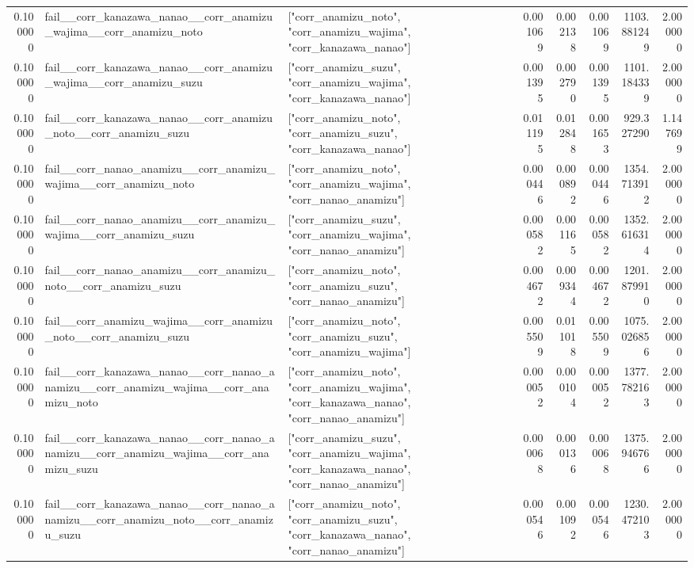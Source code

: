 \begin{tabular}{rllrrrrr}
0.100000 & fail\_\_corr\_kanazawa\_nanao\_\_corr\_anamizu\_wajima\_\_corr\_anamizu\_noto & ["corr\_anamizu\_noto", "corr\_anamizu\_wajima", "corr\_kanazawa\_nanao"] & 0.001069 & 0.002138 & 0.001069 & 1103.881249 & 2.000000 \\
0.100000 & fail\_\_corr\_kanazawa\_nanao\_\_corr\_anamizu\_wajima\_\_corr\_anamizu\_suzu & ["corr\_anamizu\_suzu", "corr\_anamizu\_wajima", "corr\_kanazawa\_nanao"] & 0.001395 & 0.002790 & 0.001395 & 1101.184339 & 2.000000 \\
0.100000 & fail\_\_corr\_kanazawa\_nanao\_\_corr\_anamizu\_noto\_\_corr\_anamizu\_suzu & ["corr\_anamizu\_noto", "corr\_anamizu\_suzu", "corr\_kanazawa\_nanao"] & 0.011195 & 0.012848 & 0.001653 & 929.327290 & 1.147699 \\
0.100000 & fail\_\_corr\_nanao\_anamizu\_\_corr\_anamizu\_wajima\_\_corr\_anamizu\_noto & ["corr\_anamizu\_noto", "corr\_anamizu\_wajima", "corr\_nanao\_anamizu"] & 0.000446 & 0.000892 & 0.000446 & 1354.713912 & 2.000000 \\
0.100000 & fail\_\_corr\_nanao\_anamizu\_\_corr\_anamizu\_wajima\_\_corr\_anamizu\_suzu & ["corr\_anamizu\_suzu", "corr\_anamizu\_wajima", "corr\_nanao\_anamizu"] & 0.000582 & 0.001165 & 0.000582 & 1352.616314 & 2.000000 \\
0.100000 & fail\_\_corr\_nanao\_anamizu\_\_corr\_anamizu\_noto\_\_corr\_anamizu\_suzu & ["corr\_anamizu\_noto", "corr\_anamizu\_suzu", "corr\_nanao\_anamizu"] & 0.004672 & 0.009344 & 0.004672 & 1201.879910 & 2.000000 \\
0.100000 & fail\_\_corr\_anamizu\_wajima\_\_corr\_anamizu\_noto\_\_corr\_anamizu\_suzu & ["corr\_anamizu\_noto", "corr\_anamizu\_suzu", "corr\_anamizu\_wajima"] & 0.005509 & 0.011018 & 0.005509 & 1075.026856 & 2.000000 \\
0.100000 & fail\_\_corr\_kanazawa\_nanao\_\_corr\_nanao\_anamizu\_\_corr\_anamizu\_wajima\_\_corr\_anamizu\_noto & ["corr\_anamizu\_noto", "corr\_anamizu\_wajima", "corr\_kanazawa\_nanao", "corr\_nanao\_anamizu"] & 0.000052 & 0.000104 & 0.000052 & 1377.782163 & 2.000000 \\
0.100000 & fail\_\_corr\_kanazawa\_nanao\_\_corr\_nanao\_anamizu\_\_corr\_anamizu\_wajima\_\_corr\_anamizu\_suzu & ["corr\_anamizu\_suzu", "corr\_anamizu\_wajima", "corr\_kanazawa\_nanao", "corr\_nanao\_anamizu"] & 0.000068 & 0.000136 & 0.000068 & 1375.946766 & 2.000000 \\
0.100000 & fail\_\_corr\_kanazawa\_nanao\_\_corr\_nanao\_anamizu\_\_corr\_anamizu\_noto\_\_corr\_anamizu\_suzu & ["corr\_anamizu\_noto", "corr\_anamizu\_suzu", "corr\_kanazawa\_nanao", "corr\_nanao\_anamizu"] & 0.000546 & 0.001092 & 0.000546 & 1230.472103 & 2.000000 \\

\end{tabular}
